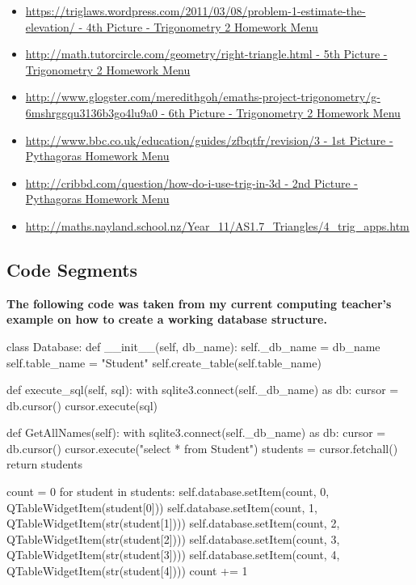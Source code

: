 \begin{itemize}
	\item \url{https://triglaws.wordpress.com/2011/03/08/problem-1-estimate-the-elevation/ - 4th Picture - Trigonometry 2 Homework Menu}
	\item \url{http://math.tutorcircle.com/geometry/right-triangle.html - 5th Picture - Trigonometry 2 Homework Menu}
	\item \url{http://www.glogster.com/meredithgoh/emaths-project-trigonometry/g-6mshrggqu3136b3go4lu9a0 - 6th Picture - Trigonometry 2 Homework Menu}
	\item \url{http://www.bbc.co.uk/education/guides/zfbqtfr/revision/3 - 1st Picture - Pythagoras Homework Menu}
	\item \url{http://cribbd.com/question/how-do-i-use-trig-in-3d - 2nd Picture - Pythagoras Homework Menu}
	\item \url{http://maths.nayland.school.nz/Year_11/AS1.7_Triangles/4_trig_apps.htm}
\end{itemize}

\subsection{Code Segments}

\textbf{The following code was taken from my current computing teacher's example on how to create a working database structure.}

\begin{python}
class Database:
    def __init__(self, db_name):
        self._db_name = db_name
        self.table_name = "Student"
        self.create_table(self.table_name)
        
    def execute_sql(self, sql):
        with sqlite3.connect(self._db_name) as db:
            cursor = db.cursor()
            cursor.execute(sql)

	def GetAllNames(self):
        with sqlite3.connect(self._db_name) as db:
            cursor = db.cursor()
            cursor.execute("select * from Student")
            students = cursor.fetchall()
            return students

	count = 0
        for student in students:
            self.database.setItem(count, 0, QTableWidgetItem(student[0]))
            self.database.setItem(count, 1, QTableWidgetItem(str(student[1])))
            self.database.setItem(count, 2, QTableWidgetItem(str(student[2])))
            self.database.setItem(count, 3, QTableWidgetItem(str(student[3])))
            self.database.setItem(count, 4, QTableWidgetItem(str(student[4])))
            count += 1
\end{python}

